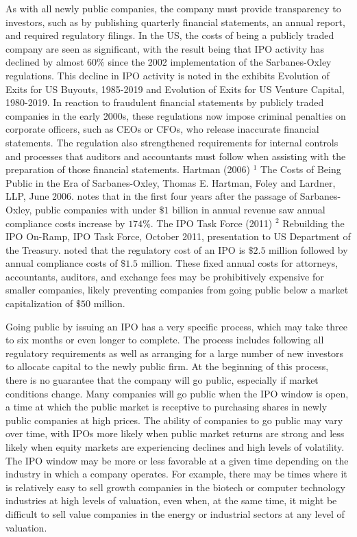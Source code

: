 \documentclass[11pt]{article}
\begin{document}
As with all newly public companies, the company must provide transparency to investors, such as by publishing quarterly financial statements, an annual report, and required regulatory filings. In the US, the costs of being a publicly traded company are seen as significant, with the result being that IPO activity has declined by almost $60 \%$ since the 2002 implementation of the Sarbanes-Oxley regulations. This decline in IPO activity is noted in the exhibits Evolution of Exits for US Buyouts, 1985-2019 and Evolution of Exits for US Venture Capital, 1980-2019. In reaction to fraudulent financial statements by publicly traded companies in the early 2000s, these regulations now impose criminal penalties on corporate officers, such as CEOs or CFOs, who release inaccurate financial statements. The regulation also strengthened requirements for internal controls and processes that auditors and accountants must follow when assisting with the preparation of those financial statements. Hartman (2006) ${ }^{1}$ The Costs of Being Public in the Era of Sarbanes-Oxley, Thomas E. Hartman, Foley and Lardner, LLP, June 2006. notes that in the first four years after the passage of Sarbanes-Oxley, public companies with under $\$ 1$ billion in annual revenue saw annual compliance costs increase by $174 \%$. The IPO Task Force (2011) ${ }^{2}$ Rebuilding the IPO On-Ramp, IPO Task Force, October 2011, presentation to US Department of the Treasury. noted that the regulatory cost of an IPO is $\$ 2.5$ million followed by annual compliance costs of $\$ 1.5$ million. These fixed annual costs for attorneys, accountants, auditors, and exchange fees may be prohibitively expensive for smaller companies, likely preventing companies from going public below a market capitalization of $\$ 50$ million.

Going public by issuing an IPO has a very specific process, which may take three to six months or even longer to complete. The process includes following all regulatory requirements as well as arranging for a large number of new investors to allocate capital to the newly public firm. At the beginning of this process, there is no guarantee that the company will go public, especially if market conditions change. Many companies will go public when the IPO window is open, a time at which the public market is receptive to purchasing shares in newly public companies at high prices. The ability of companies to go public may vary over time, with IPOs more likely when public market returns are strong and less likely when equity markets are experiencing declines and high levels of volatility. The IPO window may be more or less favorable at a given time depending on the industry in which a company operates. For example, there may be times where it is relatively easy to sell growth companies in the biotech or computer technology industries at high levels of valuation, even when, at the same time, it might be difficult to sell value companies in the energy or industrial sectors at any level of valuation.
\end{document}

